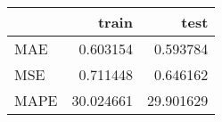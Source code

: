 \begin{tabular}{lrr}
\toprule
{} &      train &       test \\
\midrule
MAE  &   0.603154 &   0.593784 \\
MSE  &   0.711448 &   0.646162 \\
MAPE &  30.024661 &  29.901629 \\
\bottomrule
\end{tabular}
